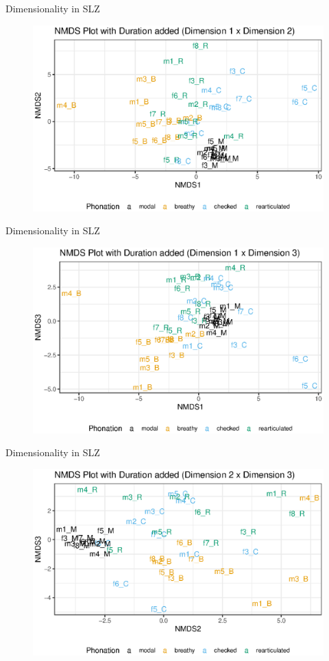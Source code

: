 \documentclass[professionalfont]{beamer}
\begin{document}
\begin{frame}{Dimensionality in SLZ}
  \begin{figure}
    \centering
    \includegraphics[width = 0.8\linewidth]{images/MDS/nmds12_dur.eps}
  \end{figure}
\end{frame}

\begin{frame}{Dimensionality in SLZ}
  \begin{figure}
    \centering
    \includegraphics[width = 0.8\linewidth]{images/MDS/nmds13_dur.eps}
  \end{figure}
\end{frame}

\begin{frame}{Dimensionality in SLZ}
  \begin{figure}
    \centering
    \includegraphics[width = 0.8\linewidth]{images/MDS/nmds23_dur.eps}
  \end{figure}
\end{frame}
\end{document}

